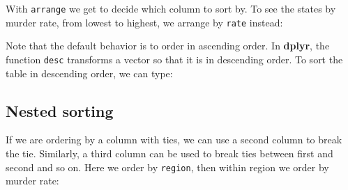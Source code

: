 \documentclass[
]{krantz}
\newenvironment{Shaded}{\begin{snugshade}}{\end{snugshade}}
\newcommand{\KeywordTok}[1]{\textcolor[rgb]{0.27,0.27,0.27}{\textbf{#1}}}
\newcommand{\NormalTok}[1]{#1}
\newcommand{\OperatorTok}[1]{\textcolor[rgb]{0.43,0.43,0.43}{\textbf{#1}}}
\newcommand{\StringTok}[1]{\textcolor[rgb]{0.5,0.5,0.5}{#1}}
\begin{document}
\begin{Shaded}
\end{Shaded}

With \texttt{arrange} we get to decide which column to sort by. To see the states by murder rate, from lowest to highest, we arrange by \texttt{rate} instead:

\begin{Shaded}
\end{Shaded}

Note that the default behavior is to order in ascending order. In \textbf{dplyr}, the function \texttt{desc} transforms a vector so that it is in descending order. To sort the table in descending order, we can type:

\begin{Shaded}
\end{Shaded}

\hypertarget{nested-sorting}{%
\subsection{Nested sorting}\label{nested-sorting}}

If we are ordering by a column with ties, we can use a second column to break the tie. Similarly, a third column can be used to break ties between first and second and so on. Here we order by \texttt{region}, then within region we order by murder rate:

\begin{Shaded}
\end{Shaded}
\end{document}
